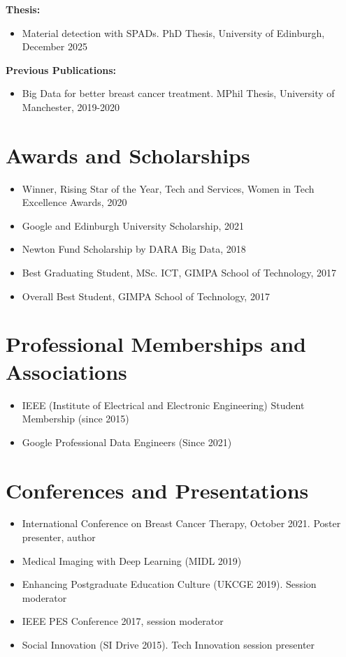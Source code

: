 \documentclass[11pt,a4paper]{article}
\begin{document}
\textbf{Thesis:}
\begin{itemize}[leftmargin=*,nosep]
    \item Material detection with SPADs. PhD Thesis, University of Edinburgh, December 2025
\end{itemize}

\textbf{Previous Publications:}
\begin{itemize}[leftmargin=*,nosep]
    \item Big Data for better breast cancer treatment. MPhil Thesis, University of Manchester, 2019-2020
\end{itemize}

\section*{Awards and Scholarships}
\begin{itemize}[leftmargin=*,nosep]
    \item Winner, Rising Star of the Year, Tech and Services, Women in Tech Excellence Awards, 2020
    \item Google and Edinburgh University Scholarship, 2021
    \item Newton Fund Scholarship by DARA Big Data, 2018
    \item Best Graduating Student, MSc. ICT, GIMPA School of Technology, 2017
    \item Overall Best Student, GIMPA School of Technology, 2017
\end{itemize}

\section*{Professional Memberships and Associations}
\begin{itemize}[leftmargin=*,nosep]
    \item IEEE (Institute of Electrical and Electronic Engineering) Student Membership (since 2015)
    \item Google Professional Data Engineers (Since 2021)
\end{itemize}

\section*{Conferences and Presentations}
\begin{itemize}[leftmargin=*,nosep]
    \item International Conference on Breast Cancer Therapy, October 2021. Poster presenter, author
    \item Medical Imaging with Deep Learning (MIDL 2019)
    \item Enhancing Postgraduate Education Culture (UKCGE 2019). Session moderator
    \item IEEE PES Conference 2017, session moderator
    \item Social Innovation (SI Drive 2015). Tech Innovation session presenter
\end{itemize}
\end{document}
